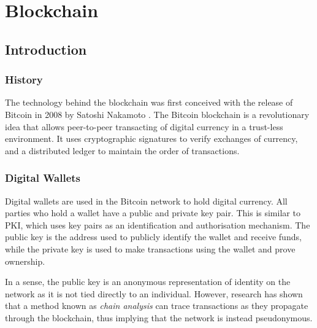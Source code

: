\chapter{Blockchain}
\section{Introduction}
\subsection{History}
The technology behind the blockchain was first conceived with the release of Bitcoin in 2008 by Satoshi Nakamoto \cite{nakamoto_bitcoin:_2008}. The Bitcoin blockchain is a revolutionary idea that allows peer-to-peer transacting of digital currency in a trust-less environment. It uses cryptographic signatures to verify exchanges of currency, and a distributed ledger to maintain the order of transactions.

\subsection{Digital Wallets}
Digital wallets are used in the Bitcoin network to hold digital currency. All parties who hold a wallet have a public and private key pair. This is similar to \ac{PKI}, which uses key pairs as an identification and authorisation mechanism. The public key is the address used to publicly identify the wallet and receive funds, while the private key is used to make transactions using the wallet and prove ownership. 

In a sense, the public key is an anonymous representation of identity on the network as it is not tied directly to an individual. However, research has shown \cite{ron_quantitative_2013, reid_analysis_2013} that a method known as \textit{chain analysis} can trace transactions as they propagate through the blockchain, thus implying that the network is instead pseudonymous.

